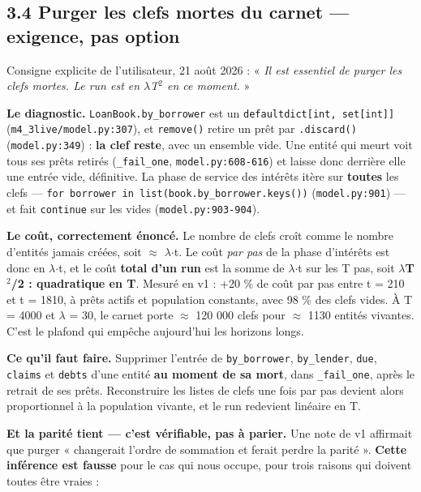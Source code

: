 \documentclass[11pt,a4paper]{article}
\newcommand{\code}[1]{\texttt{#1}}
\begin{document}
\subsection*{3.4 Purger les clefs mortes du carnet --- \textbf{exigence, pas option}}

Consigne explicite de l'utilisateur, 21 août 2026 : « \emph{Il est essentiel de purger les clefs mortes. Le run est en \ensuremath{\lambda}T\ensuremath{^2} en ce moment.} »

\textbf{Le diagnostic.} \code{LoanBook.by\_borrower} est un \code{defaultdict[int, set[int]]} (\code{m4\_3live/model.py:307}), et \code{remove()} retire un prêt par \code{.discard()} (\code{model.py:349}) : \textbf{la clef reste}, avec un ensemble vide. Une entité qui meurt voit tous ses prêts retirés (\code{\_fail\_one}, \code{model.py:608-616}) et laisse donc derrière elle une entrée vide, définitive. La phase de service des intérêts itère sur \textbf{toutes} les clefs --- \code{for borrower in list(book.by\_borrower.keys())} (\code{model.py:901}) --- et fait \code{continue} sur les vides (\code{model.py:903-904}).

\textbf{Le coût, correctement énoncé.} Le nombre de clefs croît comme le nombre d'entités jamais créées, soit \ensuremath{\approx} \ensuremath{\lambda}\ensuremath{\cdot}t. Le coût \emph{par pas} de la phase d'intérêts est donc en \ensuremath{\lambda}\ensuremath{\cdot}t, et le coût \textbf{total d'un run} est la somme de \ensuremath{\lambda}\ensuremath{\cdot}t sur les T pas, soit \textbf{\ensuremath{\lambda}T\ensuremath{^2}/2 : quadratique en T}. Mesuré en v1 : +20 \% de coût par pas entre t = 210 et t = 1810, à prêts actifs et population constants, avec 98 \% des clefs vides. À T = 4000 et \ensuremath{\lambda} = 30, le carnet porte \ensuremath{\approx} 120 000 clefs pour \ensuremath{\approx} 1130 entités vivantes. C'est le plafond qui empêche aujourd'hui les horizons longs.

\textbf{Ce qu'il faut faire.} Supprimer l'entrée de \code{by\_borrower}, \code{by\_lender}, \code{due}, \code{claims} et \code{debts} d'une entité \textbf{au moment de sa mort}, dans \code{\_fail\_one}, après le retrait de ses prêts. Reconstruire les listes de clefs une fois par pas devient alors proportionnel à la population vivante, et le run redevient linéaire en T.

\textbf{Et la parité tient --- c'est vérifiable, pas à parier.} Une note de v1 affirmait que purger « changerait l'ordre de sommation et ferait perdre la parité ». \textbf{Cette inférence est fausse} pour le cas qui nous occupe, pour trois raisons qui doivent toutes être vraies :
\end{document}
